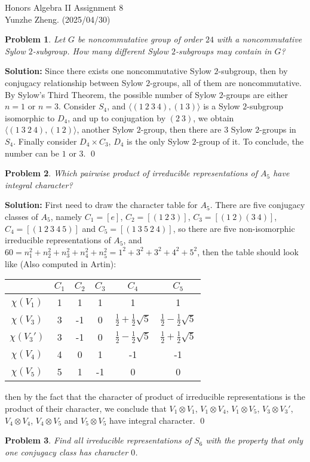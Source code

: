 \documentclass[12pt]{article}
\newtheorem{problem}{Problem}
\begin{document}
\noindent Honors Algebra II \hfill Assignment 8\\
Yunzhe Zheng. (2025/04/30)

\hrulefill

\begin{problem}
Let $G$ be noncommutative group of order $24$ with a noncommutative Sylow $2$-subgroup. How many different Sylow $2$-subgroups may contain in $G$?
\end{problem}

\textbf{Solution:} Since there exists one noncommutative Sylow $2$-subgroup, then by conjugacy relationship between Sylow $2$-groups, all of them are noncommutative. By Sylow's Third Theorem, the possible number of Sylow $2$-groups are either $n=1$ or $n=3$. Consider $S_4$, and $\langle (1\ 2\ 3\ 4), (1\ 3)\rangle$ is a Sylow $2$-subgroup isomorphic to $D_4$, and up to conjugation by $(2\ 3)$, we obtain $\langle (1\ 3\ 2\ 4), (1\ 2)\rangle$, another Sylow $2$-group, then there are $3$ Sylow $2$-groups in $S_4$. Finally consider $D_4\times C_3$, $D_4$ is the only Sylow $2$-group of it. To conclude, the number can be $1$ or $3$. \qed
\\
\begin{problem}
Which pairwise product of irreducible representations of $A_5$ have integral character?
\end{problem}

\textbf{Solution:} First need to draw the character table for $A_5$. There are five conjugacy classes of $A_5$, namely $C_1=[e]$, $C_2=[(1\ 2\ 3)]$, $C_3=[(1\ 2)(3\ 4)]$, $C_4=[(1\ 2\ 3\ 4\ 5)]$ and $C_5=[(1\ 3\ 5\ 2\ 4)]$, so there are five non-isomorphic irreducible representations of $A_5$, and $60=n_1^2+n_2^2+n_3^2+n_4^2+n_5^2=1^2+3^2+3^2+4^2+5^2$, then the table should look like (Also computed in Artin): 
\begin{center}
\begin{tabular}{||c c c c c c||} 
 \hline
  & $C_1$ & $C_2$ & $C_3$ & $C_4$ & $C_5$\\ [0.5ex] 
 \hline\hline
 $\chi(V_1)$ & 1 & 1 & 1 & 1 & 1\\ 
 \hline
 $\chi(V_3)$ & 3 & -1 & 0 & $\frac{1}{2}+\frac{1}{2}\sqrt{5}$ & $\frac{1}{2}-\frac{1}{2}\sqrt{5}$\\
 \hline
 $\chi(V_3')$ & 3 & -1 & 0 & $\frac{1}{2}-\frac{1}{2}\sqrt{5}$ & $\frac{1}{2}+\frac{1}{2}\sqrt{5}$\\
 \hline
 $\chi(V_4)$ & 4 & 0 & 1 & -1 & -1\\
 \hline
 $\chi(V_5)$ & 5 & 1 & -1 & 0 & 0\\
 \hline
\end{tabular}
\end{center} then by the fact that the character of product of irreducible representations is the product of their character, we conclude that $V_1\otimes V_1$, $V_1\otimes V_4$, $V_1\otimes V_5$, $V_3\otimes V_3'$, $V_4\otimes V_4$, $V_4\otimes V_5$ and $V_5\otimes V_5$ have integral character. \qed
\\
\begin{problem}
Find all irreducible representations of $S_6$ with the property that only one conjugacy class has character $0$.
\end{problem}
\end{document}
